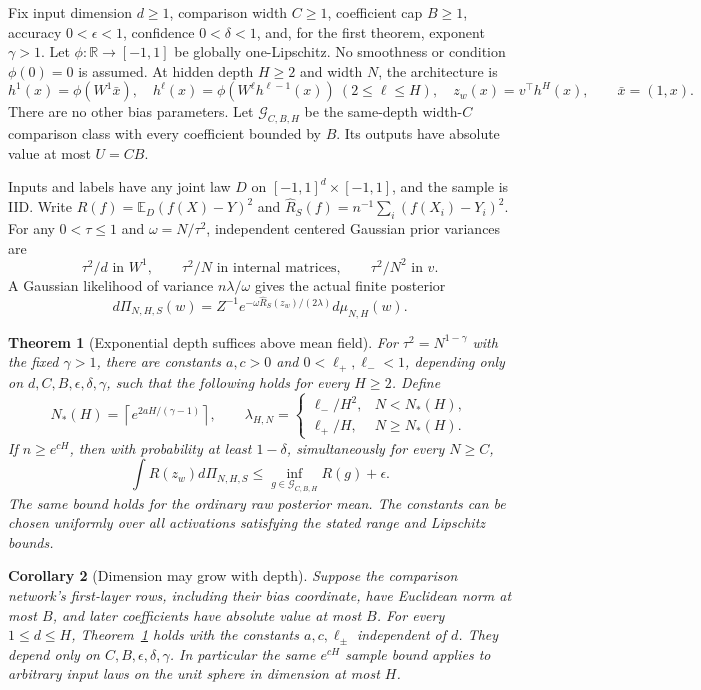 \documentclass[11pt]{article}
\newtheorem{theorem}{Theorem}[section]\newtheorem{lemma}[theorem]{Lemma}\newtheorem{proposition}[theorem]{Proposition}\newtheorem{corollary}[theorem]{Corollary}
\newcommand{\E}{\mathbb E}\newcommand{\R}{\mathbb R}\newcommand{\KL}{\operatorname{KL}}\newcommand{\op}{\mathrm{op}}
\begin{document}
Fix input dimension $d\ge1$, comparison width $C\ge1$, coefficient cap $B\ge1$, accuracy $0<\epsilon<1$, confidence $0<\delta<1$, and, for the first theorem, exponent $\gamma>1$. Let $\phi:\R\to[-1,1]$ be globally one-Lipschitz. No smoothness or condition $\phi(0)=0$ is assumed. At hidden depth $H\ge2$ and width $N$, the architecture is
\[
 h^1(x)=\phi(W^1\bar x),\quad
 h^\ell(x)=\phi(W^\ell h^{\ell-1}(x))\ (2\le\ell\le H),\quad
 z_w(x)=v^\top h^H(x),\qquad \bar x=(1,x).
\]
There are no other bias parameters. Let $\mathcal G_{C,B,H}$ be the same-depth width-$C$ comparison class with every coefficient bounded by $B$. Its outputs have absolute value at most $U=CB$.

Inputs and labels have any joint law $D$ on $[-1,1]^d\times[-1,1]$, and the sample is IID. Write $R(f)=\E_D(f(X)-Y)^2$ and $\widehat R_S(f)=n^{-1}\sum_i(f(X_i)-Y_i)^2$.
For any $0<\tau\le1$ and $\omega=N/\tau^2$, independent centered Gaussian prior variances are
\[
 \tau^2/d\text{ in }W^1,\qquad
 \tau^2/N\text{ in internal matrices},\qquad
 \tau^2/N^2\text{ in }v.
\]
A Gaussian likelihood of variance $n\lambda/\omega$ gives the actual finite posterior
\begin{equation}
 d\Pi_{N,H,S}(w)=Z^{-1}e^{-\omega\widehat R_S(z_w)/(2\lambda)}d\mu_{N,H}(w).
 \label{eq:posterior}
\end{equation}

\begin{theorem}[Exponential depth suffices above mean field]
\label{thm:main}
For $\tau^2=N^{1-\gamma}$ with the fixed $\gamma>1$, there are constants $a,c>0$ and $0<\ell_+,\ell_-<1$, depending only on $d,C,B,\epsilon,\delta,\gamma$, such that the following holds for every $H\ge2$. Define
\[
 N_*(H)=\left\lceil e^{2aH/(\gamma-1)}\right\rceil,
 \qquad
 \lambda_{H,N}=
 \begin{cases}
 \ell_-/H^2,&N<N_*(H),\\
 \ell_+/H,&N\ge N_*(H).
 \end{cases}
\]
If $n\ge e^{cH}$, then with probability at least $1-\delta$, simultaneously for every $N\ge C$,
\begin{equation}
 \int R(z_w)d\Pi_{N,H,S}
 \le\inf_{g\in\mathcal G_{C,B,H}}R(g)+\epsilon.
 \label{eq:main}
\end{equation}
The same bound holds for the ordinary raw posterior mean. The constants can be chosen uniformly over all activations satisfying the stated range and Lipschitz bounds.
\end{theorem}

\begin{corollary}[Dimension may grow with depth]
\label{cor:joint-dimension}
Suppose the comparison network's first-layer rows, including their bias coordinate, have Euclidean norm at most $B$, and later coefficients have absolute value at most $B$. For every $1\le d\le H$, Theorem~\ref{thm:main} holds with the constants $a,c,\ell_\pm$ independent of $d$. They depend only on $C,B,\epsilon,\delta,\gamma$. In particular the same $e^{cH}$ sample bound applies to arbitrary input laws on the unit sphere in dimension at most $H$.
\end{corollary}
\end{document}
